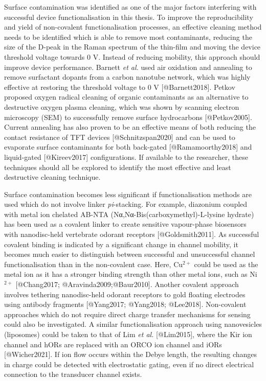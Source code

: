 \documentclass[
  letterpaper,
  DIV=11,
  numbers=noendperiod]{scrartcl}
\begin{document}
Surface contamination was identified as one of the major factors
interfering with successful device functionalisation in this thesis. To
improve the reproducibility and yield of non-covalent functionalisation
processes, an effective cleaning method needs to be identified which is
able to remove most contaminants, reducing the size of the D-peak in the
Raman spectrum of the thin-film and moving the device threshold voltage
towards 0 V. Instead of reducing mobility, this approach should improve
device performance. Barnett \emph{et al.} used air oxidation and
annealing to remove surfactant dopants from a carbon nanotube network,
which was highly effective at restoring the threshold voltage to 0 V
{[}@Barnett2018{]}. Petkov proposed oxygen radical cleaning of organic
contaminants as an alternative to destructive oxygen plasma cleaning,
which was shown by scanning electron microscopy (SEM) to successfully
remove surface hydrocarbons {[}@Petkov2005{]}. Current annealing has
also proven to be an effective means of both reducing the contact
resistance of TFT devices {[}@Schnitzspan2020{]} and can be used to
evaporate surface contaminants for both back-gated
{[}@Ramamoorthy2018{]} and liquid-gated {[}@Kireev2017{]}
configurations. If available to the researcher, these techniques should
all be explored to identify the most effective and least destructive
cleaning technique.

Surface contamination becomes less significant if functionalisation
methods are used which do not involve linker \emph{pi}-stacking. For
example, diazonium coupled with metal ion chelated AB-NTA
(Nα,Nα-Bis(carboxymethyl)-L-lysine hydrate) has been used as a covalent
linker to create sensitive vapour-phase biosensors with nanodisc-held
vertebrate odorant receptors {[}@Goldsmith2011{]}. As successful
covalent binding is indicated by a significant change in channel
mobility, it becomes much easier to distinguish between successful and
unsuccessful channel functionalisation than in the non-covalent case.
Here, Cu\(^{2+}\) could be used as the metal ion as it has a stronger
binding strength than other metal ions, such as Ni\(^{2+}\)
{[}@Chang2017; @Aravinda2009;@Baur2010{]}. Another covalent approach
involves tethering nanodisc-held odorant receptors to gold floating
electrodes using antibody fragments {[}@Yang2017; @Yang2018;
@Lee2018{]}. Non-covalent approaches which do not require direct charge
transfer mechanisms for sensing could also be investigated. A similar
functionalisation approach using nanovesicles (liposomes) could be taken
to that of Lim \emph{et al.} {[}@Lim2015{]}, where the Kir ion channel
and hORs are replaced with an ORCO ion channel and iORs
{[}@Wicher2021{]}. If ion flow occurs within the Debye length, the
resulting changes in charge could be detected with electrostatic gating,
even if no direct electrical connection to the transducer channel
exists.
\end{document}
